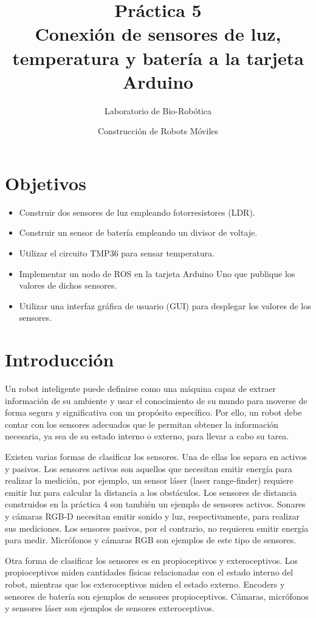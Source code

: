 \documentclass[a4paper,12pt]{article}
\title{Práctica 5 \\ Conexión de sensores de luz, temperatura y batería a la tarjeta Arduino}
\author{Laboratorio de Bio-Robótica}
\date{Construcción de Robots Móviles}
\begin{document}
\renewcommand{\tablename}{Tabla}
\maketitle
\section*{Objetivos}
\begin{itemize}
\item Construir dos sensores de luz empleando fotorresistores (LDR).
\item Construir un sensor de batería empleando un divisor de voltaje.
\item Utilizar el circuito TMP36 para sensar temperatura.
\item Implementar un nodo de ROS en la tarjeta Arduino Uno que publique los valores  de dichos sensores. 
\item Utilizar una interfaz gráfica de usuario (GUI) para desplegar los valores de los sensores. 
\end{itemize}

\section{Introducción}
Un robot inteligente puede definirse como una máquina capaz de extraer información de su ambiente y usar el conocimiento de su mundo para moverse de forma segura y significativa con un propósito específico. Por ello, un robot debe contar con los sensores adecuados que le permitan obtener la información necesaria, ya sea de su estado interno o externo, para llevar a cabo su tarea. 

Existen varias formas de clasificar los sensores. Una de ellas los separa en activos y pasivos. Los sensores activos son aquellos que necesitan emitir energía para realizar la medición, por ejemplo, un sensor láser (laser range-finder) requiere emitir luz para calcular la distancia a los obstáculos. Los sensores de distancia construidos en la práctica 4 son también un ejemplo de sensores activos. Sonares y cámaras RGB-D necesitan emitir sonido y luz, respectivamente, para realizar sus mediciones. Los sensores pasivos, por el contrario, no requieren emitir energía para medir. Micrófonos y cámaras RGB son ejemplos de este tipo de sensores. 

Otra forma de clasificar los sensores es en propioceptivos y exteroceptivos. Los propioceptivos miden cantidades físicas relacionadas con el estado interno del robot, mientras que los exteroceptivos miden el estado externo. Encoders y sensores de batería son ejemplos de sensores propioceptivos. Cámaras, micrófonos y sensores láser son ejemplos de sensores exteroceptivos. 
\end{document}
